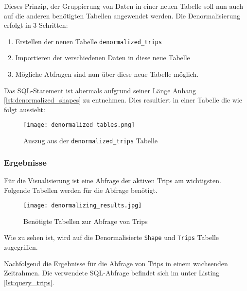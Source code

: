   Dieses Prinzip, der Gruppierung von Daten in einer neuen Tabelle soll nun auch auf die anderen benötigten Tabellen angewendet werden. Die Denormalisierung erfolgt in 3 Schritten:

  \begin{enumerate}
    \item Erstellen der neuen Tabelle \texttt{denormalized\_trips}
    \item Importieren der verschiedenen Daten in diese neue Tabelle
    \item Mögliche Abfragen sind nun über diese neue Tabelle möglich.
  \end{enumerate}

  Das SQL-Statement ist abermals aufgrund seiner Länge Anhang \ref{lst:denormalized_shapes} zu entnehmen. Dies resultiert in einer Tabelle die wie folgt aussieht:

  \begin{figure}[htbp]
    \begin{center}
      \texttt{[image: denormalized\_tables.png]}
      \caption{Auszug aus der \texttt{denormalized\_trips} Tabelle}
      \label{fig:denormalized_table}
    \end{center}
  \end{figure}  

  \subsubsection*{Ergebnisse}
  \label{ssub:ergebnisse}
    Für die Visualisierung ist eine Abfrage der aktiven Trips am wichtigsten.
    Folgende Tabellen werden für die Abfrage benötigt.

    \begin{figure}[htbp]
      \begin{center}
        \texttt{[image: denormalizing\_results.jpg]}
        \caption{Benötigte Tabellen zur Abfrage von Trips}
        \label{fig:denormalizing_results}
      \end{center}
    \end{figure}

    Wie zu sehen ist, wird auf die Denormalisierte \texttt{Shape} und \texttt{Trips} Tabelle zugegriffen.

    Nachfolgend die Ergebnisse für die Abfrage von Trips in einem wachsenden Zeitrahmen. Die verwendete SQL-Abfrage befindet sich im  unter Listing \ref{lst:query_trips}.

